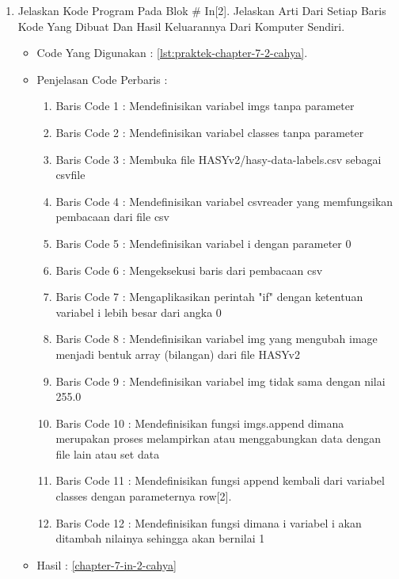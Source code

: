 \begin{enumerate}
\par
\par
\par
\item Jelaskan Kode Program Pada Blok \# In[2]. Jelaskan Arti Dari Setiap Baris Kode Yang Dibuat Dan Hasil Keluarannya Dari Komputer Sendiri.
\begin{itemize}
\item Code Yang Digunakan : \ref{lst:praktek-chapter-7-2-cahya}.

\par
\par
\item Penjelasan Code Perbaris	: 
\begin{enumerate}
\item Baris Code 1	: Mendefinisikan variabel imgs tanpa parameter
\item Baris Code 2	: Mendefinisikan variabel classes tanpa parameter
\item Baris Code 3	: Membuka file HASYv2/hasy-data-labels.csv sebagai csvfile
\item Baris Code 4	: Mendefinisikan variabel csvreader yang memfungsikan pembacaan dari file csv
\item Baris Code 5	: Mendefinisikan variabel i dengan parameter 0
\item Baris Code 6	: Mengeksekusi baris dari pembacaan csv 
\item Baris Code 7	: Mengaplikasikan perintah "if" dengan ketentuan variabel i lebih besar dari angka 0
\item Baris Code 8	: Mendefinisikan variabel img yang mengubah image menjadi bentuk array (bilangan) dari file HASYv2
\item Baris Code 9	: Mendefinisikan variabel img tidak sama dengan nilai 255.0
\item Baris Code 10	: Mendefinisikan fungsi imgs.append dimana merupakan proses melampirkan atau menggabungkan data dengan file lain atau set data
\item Baris Code 11	: Mendefinisikan fungsi append kembali dari variabel classes dengan parameternya row[2].
\item Baris Code 12	: Mendefinisikan fungsi dimana i variabel i akan ditambah nilainya sehingga akan bernilai 1
\end{enumerate}
\par
\item Hasil : \ref{chapter-7-in-2-cahya}

\end{itemize}
\end{enumerate}
